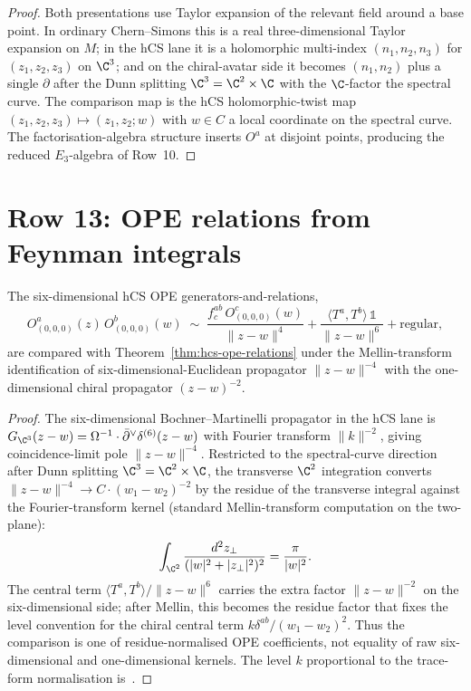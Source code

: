 \begin{proof}
Both presentations use Taylor expansion of the relevant field around a
base point. In ordinary Chern--Simons this is a real three-dimensional
Taylor expansion on $M$; in the hCS lane it is a holomorphic
multi-index $(n_1,n_2,n_3)$ for $(z_1,z_2,z_3)$ on $\C^3$; and on the
chiral-avatar side it becomes $(n_1,n_2)$ plus a single $\partial$ after
the Dunn splitting $\C^3=\C^2\times\C$ with the $\C$-factor the spectral
curve. The comparison map is the hCS holomorphic-twist map
$(z_1,z_2,z_3)\mapsto (z_1,z_2;w)$ with $w\in C$ a local coordinate on
the spectral curve. The factorisation-algebra structure inserts $O^a$
at disjoint points, producing the reduced $E_3$-algebra of Row~10.
\end{proof}

\section{Row 13: OPE relations from Feynman integrals}
\label{sec:cfg-row-13-ope}

\begin{theorem}
\label{thm:cfg-row-13}
The six-dimensional hCS OPE generators-and-relations,
\[
 O^a_{(0,0,0)}(z)\,O^b_{(0,0,0)}(w)
 \;\sim\;
 \frac{f^{ab}_c\,O^c_{(0,0,0)}(w)}{\|z-w\|^4}
 + \frac{\langle T^a,T^b\rangle\,\mathbb 1}{\|z-w\|^6}
 + \mathrm{regular},
\]
are compared with Theorem~\ref{thm:hcs-ope-relations} under the Mellin-transform
identification of six-dimensional-Euclidean propagator
$\|z-w\|^{-4}$ with the one-dimensional chiral propagator
$(z-w)^{-2}$.
\end{theorem}

\begin{proof}
The six-dimensional Bochner--Martinelli propagator in the hCS lane is
$G_{\C^3}(z-w) = \Omega^{-1}\cdot \dbar^\vee\delta^{(6)}(z-w)$ with
Fourier transform $\|k\|^{-2}$, giving coincidence-limit pole
$\|z-w\|^{-4}$. Restricted to the spectral-curve direction after
Dunn splitting $\C^3 = \C^2\times\C$, the transverse $\C^2$
integration converts
$\|z-w\|^{-4}\to C\cdot(w_1-w_2)^{-2}$ by the residue of the
transverse integral against the Fourier-transform kernel (standard
Mellin-transform computation on the two-plane):
\[
 \int_{\C^2}\frac{d^2z_{\perp}}{(|w|^2+|z_\perp|^2)^2}
 = \frac{\pi}{|w|^2}.
\]
The central term $\langle T^a,T^b\rangle/\|z-w\|^6$ carries the extra
factor $\|z-w\|^{-2}$ on the six-dimensional side; after Mellin, this
becomes the residue factor that fixes the level convention for the
chiral central term $k\delta^{ab}/(w_1-w_2)^2$. Thus the comparison is
one of residue-normalised OPE coefficients, not equality of raw
six-dimensional and one-dimensional kernels. The level $k$ proportional
to the trace-form normalisation is~\cite{CostelloYangian}.
\end{proof}

